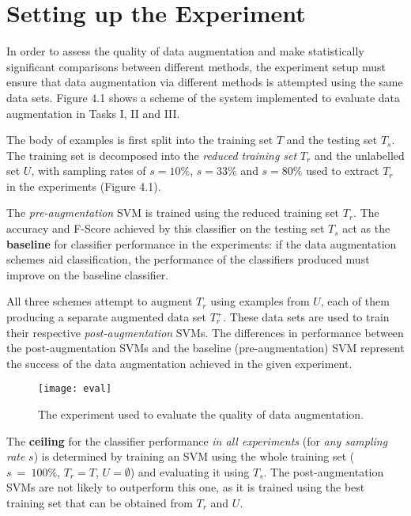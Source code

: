 \documentclass[12pt,twoside,notitlepage,amsart]{report} %
\begin{document}
	
	
	\section{Setting up the Experiment}
		
	In order to assess the quality of data augmentation and make statistically significant comparisons between different methods, the experiment setup must ensure that data augmentation via different methods is attempted using the same data sets. Figure 4.1 shows a scheme of the system implemented to evaluate data augmentation in Tasks I, II and III. 
	
	The body of examples is first split into the training set $T$ and the testing set $T_s$. The training set is decomposed into the \emph{reduced training set} $T_r$ and the unlabelled set $U$, with sampling rates of $s=10\%$, $s=33\%$ and $s=80\%$ used to extract $T_r$ in the experiments (Figure 4.1). 
	
	The \emph{pre-augmentation} SVM is trained using the reduced training set $T_r$. The accuracy and F-Score achieved by this classifier on the testing set $T_s$ act as the \textbf{baseline} for classifier performance in the experiments: if the data augmentation schemes aid classification, the performance of the classifiers produced must improve on the baseline classifier. 
	
	All three schemes attempt to augment $T_r$ using examples from $U$, each of them producing a separate augmented data set $T_{r}^{+}$. These data sets are used to train their respective \emph{post-augmentation} SVMs. The differences in performance between the {post-augmentation} SVMs and the baseline ({pre-augmentation}) SVM represent the success of the data augmentation achieved in the given experiment. \\
	
	\begin{figure} 
	\texttt{[image: eval]}%
	\caption{The experiment used to evaluate the quality of data augmentation.}%
	\label{}%
	\end{figure}
	
	The \textbf{ceiling} for the classifier performance \emph{in all experiments} (for \emph{any sampling rate} $s$) is determined by training an SVM using the whole training set ($s~=~100\%$, $T_r = T$, $U = \emptyset$) and evaluating it using $T_s$. The post-augmentation SVMs are not likely to outperform this one, as it is trained using the best training set that can be obtained from $T_r$ and $U$. 
	
\end{document}
